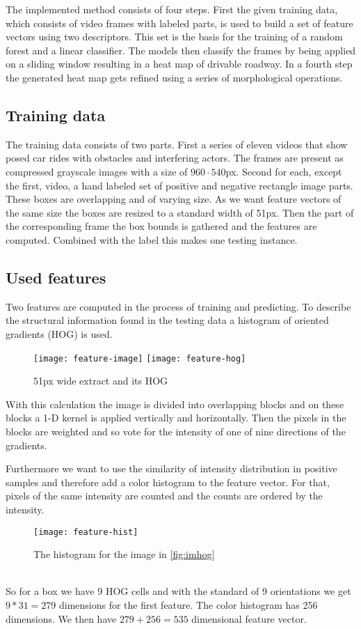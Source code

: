 The implemented method consists of four steps. First the given training data, which consists of video frames with labeled parts, is used to build a set of feature vectors using two descriptors. This set is the basis for the training of a random forest and a linear classifier. The models then classify the frames by being applied on a sliding window resulting in a heat map of drivable roadway. In a fourth step the generated heat map gets refined using a series of morphological operations.

\subsection{Training data} %
\label{sub:training_data}
The training data consists of two parts. First a series of eleven videos that show posed car rides with obstacles and interfering actors. The frames are present as compressed grayscale images with a size of $960\cdot 540$px. Second for each, except the first, video, a hand labeled set of positive and negative rectangle image parts. These boxes are overlapping and of varying size. As we want feature vectors of the same size the boxes are resized to a standard width of 51px. Then  the part of the corresponding frame the box bounds is gathered and the features are computed. Combined with the label this makes one testing instance.

\subsection{Used features} %
\label{sub:used_features}
Two features are computed in the process of training and predicting. To describe the structural information found in the testing data a histogram of oriented gradients\cite{uoctti} (HOG) is used.
\begin{figure}[h]
	\centering
	\texttt{[image: feature-image]}
	\texttt{[image: feature-hog]}
	\caption{51px wide extract and its HOG}
	\label{fig:imhog}
\end{figure}
With this calculation the image is divided into overlapping blocks and on these blocks a 1-D kernel is applied vertically and horizontally. Then the pixels in the blocks are weighted and so vote for the intensity of one of nine directions of the gradients.

Furthermore we want to use the similarity of intensity distribution in positive samples and therefore add a color histogram to the feature vector. For that, pixels of the same intensity are counted and the counts are ordered by the intensity.
{\begin{figure}[h]
	\centering
	\texttt{[image: feature-hist]}
	\caption{The histogram for the image in \autoref{fig:imhog}}
	\label{fig:limhist}
\end{figure}}\\
So for a box we have 9 HOG cells and with the standard of 9 orientations we get $9*31 = 279$ dimensions for the first feature. The color histogram has 256 dimensions. We then have $279+256=535$ dimensional feature vector.


